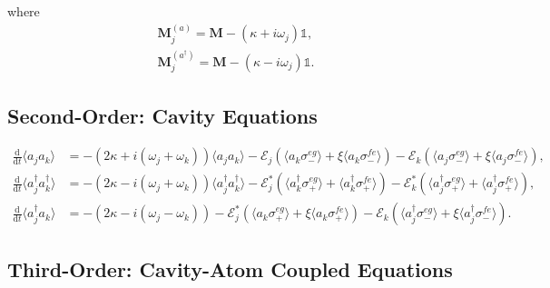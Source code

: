 \documentclass{article}
\newcommand{\ddt}{\frac{\mathrm{d}}{\mathrm{d}t}}
\begin{document}
where
\begin{subequations}
	\begin{gather}
		\bm{M}_{j}^{(a)} = \bm{M} - \left( \kappa + i \omega_{j} \right) \mathbb{1}, \\
		\bm{M}_{j}^{(a^{\dagger})} = \bm{M} - \left( \kappa - i \omega_{j} \right) \mathbb{1}.
	\end{gather}
\end{subequations}

\subsection{Second-Order: Cavity Equations}

\begin{subequations}
\begin{align}
	\ddt \langle a_{j} a_{k} \rangle &= -\left(2 \kappa + i \left( \omega_{j} + \omega_{k} \right) \right) \langle a_{j} a_{k} \rangle - \mathcal{E}_{j} \left( \langle a_{k} \sigma^{eg}_{-} \rangle + \xi \langle a_{k} \sigma^{fe}_{-} \rangle \right) - \mathcal{E}_{k} \left( \langle a_{j} \sigma^{eg}_{-} \rangle + \xi \langle a_{j} \sigma^{fe}_{-} \rangle \right), \\
	\ddt \langle a^{\dagger}_{j} a^{\dagger}_{k} \rangle &= -\left(2 \kappa - i \left( \omega_{j} + \omega_{k} \right) \right) \langle a^{\dagger}_{j} a^{\dagger}_{k} \rangle - \mathcal{E}_{j}^{*} \left( \langle a^{\dagger}_{k} \sigma^{eg}_{+} \rangle + \langle a^{\dagger}_{k} \sigma^{fe}_{+} \rangle \right) - \mathcal{E}_{k}^{*} \left( \langle a^{\dagger}_{j} \sigma^{eg}_{+} \rangle + \langle a^{\dagger}_{j} \sigma^{fe}_{+} \rangle \right), \\
	\ddt \langle a^{\dagger}_{j} a_{k} \rangle &= -\left( 2\kappa - i \left( \omega_{j} - \omega_{k} \right) \right) - \mathcal{E}_{j}^{*} \left( \langle a_{k} \sigma^{eg}_{+} \rangle + \xi \langle a_{k} \sigma^{fe}_{+} \rangle \right)- \mathcal{E}_{k} \left( \langle a_{j}^{\dagger} \sigma^{eg}_{-} \rangle + \xi \langle a_{j}^{\dagger} \sigma^{fe}_{-} \rangle \right).
\end{align}
\end{subequations}

\subsection{Third-Order: Cavity-Atom Coupled Equations}
\end{document}
